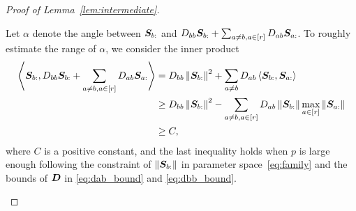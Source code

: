 \documentclass[lettersize,onecolumn,journal]{IEEEtran}
\theoremstyle{definition}
\theoremstyle{definition}
\newcommand{\ang}[1]{\left\langle#1\right\rangle}
\begin{document}
\begin{proof}[Proof of Lemma~\ref{lem:intermediate}]
\begin{enumerate}[wide]
    Let $\alpha$ denote the angle between $\bm S_{b:}$ and $D_{bb} \bm S_{b:} + \sum_{a \neq b, a \in [r]} D_{ab} \bm S_{a:}$. To roughly estimate the range of $\alpha$, we consider the inner product 
    \begin{align}
        \ang{\mS_{b:},  D_{bb} \mS_{b:} + \sum_{a \neq b, a \in [r]} D_{ab} \mS_{a:}}  &= D_{bb} \onorm{\mS_{b:}}^2 + \sum_{a \neq b} D_{ab}\ang{\mS_{b:}, \mS_{a:}}\\
        &\geq D_{bb} \onorm{\mS_{b:}}^2 -  \sum_{a \neq b, a \in [r]} D_{ab}   \onorm{\mS_{b:}} \max_{a \in [r]}  \onorm{\mS_{a:}} \\
        & \geq C,
    \end{align}
    where $C$ is a positive constant, and the last inequality holds when $p$ is large enough following the constraint of $\left\lVert\bm S_{b:}\right\rVert$ in parameter space~\eqref{eq:family} and the bounds of $\bm{D}$ in \eqref{eq:dab_bound} and \eqref{eq:dbb_bound}.
    

\end{enumerate}
\end{proof}
\end{document}
